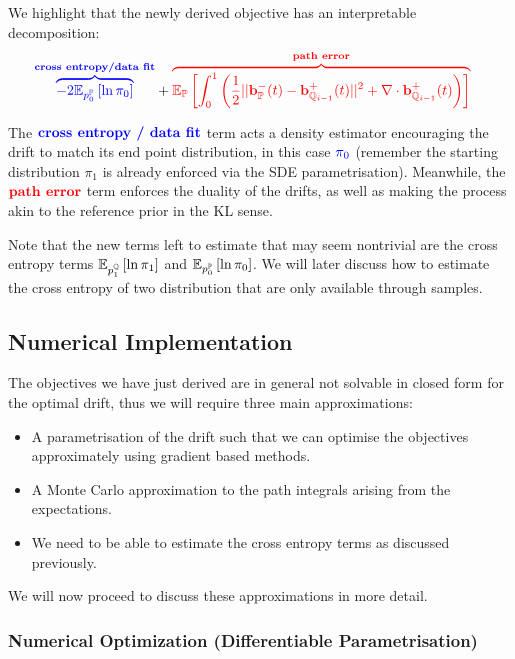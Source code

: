 \documentclass[a4paper,12pt,twoside,openright]{report}
\makeatletter
\theoremstyle{definition}
\def\mathcolor#1#{\@mathcolor{#1}}
\def\@mathcolor#1#2#3{%
  \protect\leavevmode
  \begingroup
    \color#1{#2}#3%
  \endgroup
}
\makeatother
\begin{document}
We highlight that the newly derived objective has an interpretable  decomposition:
\begin{align*}
 \mathcolor{blue}{\overbrace{-2\E_{p^{\P}_0}\left[\log \pi_0 \right]}^{\textbf{cross entropy/data fit}}} &+ \mathcolor{red}{\overbrace{\E_{\P}\left[\int_0^1 \left(\frac{1}{2}||\rvb_\P^{-}(t) - \rvb_{\Q_{i-1}}^{+}(t)||^2 + \nabla\cdot\rvb^{+}_{\Q_{i-1}}(t) \right)\right] }^{\textbf{path error}}}
\end{align*}

The $\mathcolor{blue}{\textbf{cross entropy / data fit}}$ term acts a density estimator encouraging the drift to match its end point distribution, in this case $\mathcolor{blue}{\pi_0}$ (remember the starting distribution $\pi_1$ is already enforced via the SDE parametrisation). Meanwhile, the $\mathcolor{red}{\textbf{path error}}$ term enforces the duality of the drifts, as well as making the process akin to the reference prior in the KL sense.

Note that the new terms left to estimate that may seem nontrivial are the cross entropy terms $\mathbb{E}_{p^{{\mathbb{Q}}}_1}\left[\operatorname{ln} \pi_1 \right]$ and $\mathbb{E}_{p^{{\mathbb{P}}}_0}\left[\operatorname{ln} \pi_0 \right]$. We will later discuss how to estimate the cross entropy of two distribution that are only available through samples. 

\subsection{Numerical Implementation}

The objectives we have just derived are in general not solvable in closed form for the optimal drift, thus we will require three main approximations:
\begin{itemize}
    \item A parametrisation of the drift such that we can optimise the objectives approximately using gradient based methods.
    \item A Monte Carlo approximation to the path integrals arising from the expectations.
    \item We need to be able to estimate the cross entropy terms as discussed previously.
\end{itemize}

We will now proceed to discuss these approximations in more detail.
\subsubsection{Numerical Optimization (Differentiable Parametrisation)}
\end{document}
